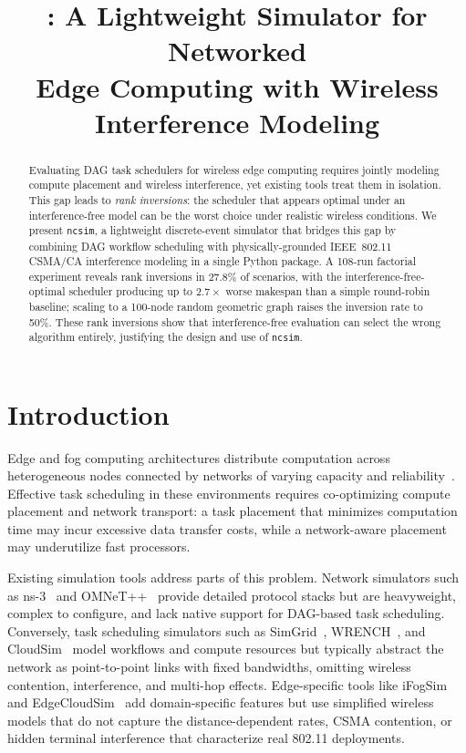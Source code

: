 \documentclass[conference]{IEEEtran}
\title{\ncsim{}: A Lightweight Simulator for Networked\\Edge Computing with Wireless Interference Modeling}
\author{
\IEEEauthorblockN{Bhaskar Krishnamachari\IEEEauthorrefmark{1},
Maya Gutierrez\IEEEauthorrefmark{1}, and
Jared Coleman\IEEEauthorrefmark{1}\IEEEauthorrefmark{2}}
\IEEEauthorblockA{\IEEEauthorrefmark{1}University of Southern California\\
bkrishna@usc.edu, mayaguti@usc.edu}
\IEEEauthorblockA{\IEEEauthorrefmark{2}Loyola Marymount University\\
jared.coleman@lmu.edu}
}
\newcommand{\ncsim}{\texttt{ncsim}}
\begin{document}
\maketitle

\begin{abstract}
Evaluating DAG task schedulers for wireless edge computing requires
jointly modeling compute placement and wireless interference, yet
existing tools treat them in isolation.  This gap leads to
\emph{rank inversions}: the scheduler that appears optimal under an
interference-free model can be the worst choice under realistic
wireless conditions.  We present \ncsim{}, a lightweight
discrete-event simulator that bridges this gap by combining DAG
workflow scheduling with physically-grounded IEEE~802.11 CSMA/CA
interference modeling in a single Python package.  A 108-run
factorial experiment reveals rank inversions in 27.8\% of scenarios,
with the interference-free-optimal scheduler producing up to
$2.7\times$ worse makespan than a simple round-robin baseline;
scaling to a 100-node random geometric graph raises the inversion
rate to 50\%.  These rank inversions show that
interference-free evaluation can select the wrong algorithm
entirely, justifying the design and use of \ncsim{}.
\end{abstract}

\section{Introduction}
\label{sec:intro}

Edge and fog computing architectures distribute computation across
heterogeneous nodes connected by networks of varying capacity and
reliability~\cite{shi2016edge}.  Effective task scheduling in these
environments requires co-optimizing compute placement and network transport:
a task placement that minimizes computation time may incur excessive data
transfer costs, while a network-aware placement may underutilize fast
processors.

Existing simulation tools address parts of this problem.  Network simulators
such as ns-3~\cite{ns3} and OMNeT++~\cite{omnetpp} provide detailed protocol
stacks but are heavyweight, complex to configure, and lack native support for
DAG-based task scheduling.  Conversely, task scheduling simulators such as
SimGrid~\cite{simgrid}, WRENCH~\cite{wrench}, and CloudSim~\cite{cloudsim}
model workflows and compute resources but typically abstract the network as
point-to-point links with fixed bandwidths, omitting wireless contention,
interference, and multi-hop effects.  Edge-specific tools like
iFogSim~\cite{ifogsim} and EdgeCloudSim~\cite{edgecloudsim} add
domain-specific features but use simplified wireless models that do not
capture the distance-dependent rates, CSMA contention, or hidden terminal
interference that characterize real 802.11 deployments.
\end{document}
